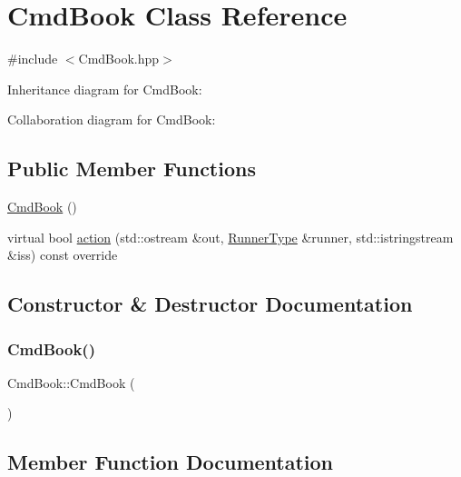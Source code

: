 \hypertarget{classCmdBook}{}\section{Cmd\+Book Class Reference}
\label{classCmdBook}


{\ttfamily \#include $<$Cmd\+Book.\+hpp$>$}



Inheritance diagram for Cmd\+Book\+:


Collaboration diagram for Cmd\+Book\+:
\subsection*{Public Member Functions}
\begin{DoxyCompactItemize}
\item 
\hyperlink{classCmdBook_a1f6b2ca988342969602ed97012c15431}{Cmd\+Book} ()
\item 
virtual bool \hyperlink{classCmdBook_ad3d3448c7cc058a1ca346d85e40abc66}{action} (std\+::ostream \&out, \hyperlink{Command_8hpp_ad45c3de597c2023a8be0399d914161f4}{Runner\+Type} \&runner, std\+::istringstream \&iss) const override
\end{DoxyCompactItemize}


\subsection{Constructor \& Destructor Documentation}
\mbox{\label{classCmdBook_a1f6b2ca988342969602ed97012c15431}} 
\subsubsection{\texorpdfstring{Cmd\+Book()}{CmdBook()}}
{\footnotesize\ttfamily Cmd\+Book\+::\+Cmd\+Book (\begin{DoxyParamCaption}{ }\end{DoxyParamCaption})}



\subsection{Member Function Documentation}
\mbox{\label{classCmdBook_ad3d3448c7cc058a1ca346d85e40abc66}} 
